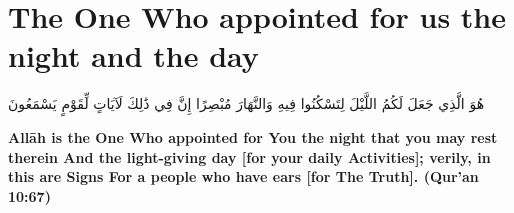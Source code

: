 \chapter{The One Who appointed for us the night and the day}
\begin{center}
    {\Huge    
        \begin{Arabic}
            هُوَ الَّذِي جَعَلَ لَكُمُ اللَّيْلَ لِتَسْكُنُوا فِيهِ وَالنَّهَارَ مُبْصِرًا إِنَّ فِي ذَٰلِكَ لَآيَاتٍ لِّقَوْمٍ يَسْمَعُونَ
        \end{Arabic}
    }    
\end{center}
\vspace*{\fill}
\vspace{3cm}
\begin{center}
    \large \textbf{Allāh is the One Who appointed for You the night that you may rest therein And the light-giving day [for your daily Activities]; verily, in this are Signs For a people who have ears [for The Truth]. (Qur'an 10:67)}
\end{center}

